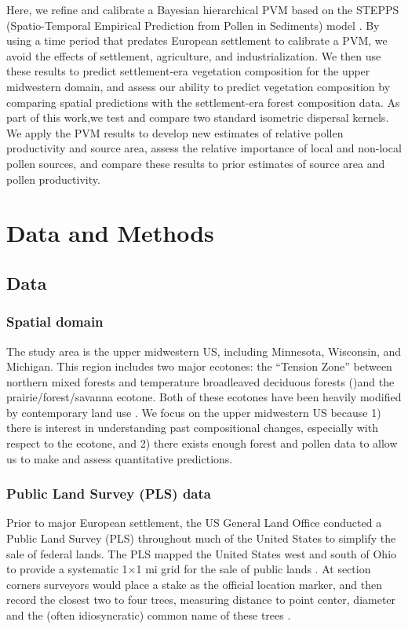\documentclass[12pt]{article}
\begin{document}
Here, we refine and calibrate a Bayesian hierarchical PVM based on the
STEPPS (Spatio-Temporal Empirical Prediction from Pollen in Sediments)
model \citep{paciorek2009mapping}. By using a time period that
predates European settlement to calibrate a PVM, we avoid the effects
of settlement, agriculture, and industrialization. We then use these
results to predict settlement-era vegetation composition for the upper
midwestern domain, and assess our ability to predict vegetation
composition by comparing spatial predictions with the settlement-era
forest composition data. As part of this work,we test and compare two
standard isometric dispersal kernels. We apply the PVM results to
develop new estimates of relative pollen productivity and source area,
assess the relative importance of local and non-local pollen sources,
and compare these results to prior estimates of source area and pollen
productivity.

\section{Data and Methods}

\subsection{Data}

\subsubsection{Spatial domain}

The study area is the upper midwestern US, including Minnesota,
Wisconsin, and Michigan.  This region includes two major ecotones: the
``Tension Zone'' between northern mixed forests and temperature
broadleaved deciduous forests (\citet{curtis1959vegetation})and the
prairie/forest/savanna ecotone.  Both of these ecotones have been
heavily modified by contemporary land use \citep{goring_witness}. We
focus on the upper midwestern US because 1) there is interest in
understanding past compositional changes, especially with respect to
the ecotone, and 2) there exists enough forest and pollen data to
allow us to make and assess quantitative predictions.

\subsubsection{Public Land Survey (PLS) data}
Prior to major European settlement, the US General Land Office
conducted a Public Land Survey (PLS) throughout much of the United
States to simplify the sale of federal lands. The PLS mapped the
United States west and south of Ohio to provide a systematic
1$\times$1 mi grid for the sale of public lands
\citep{stewart1935public, white1983history}. At section corners
surveyors would place a stake as the official location marker, and
then record the closest two to four trees, measuring distance to point
center, diameter and the (often idiosyncratic) common name of these
trees \citep{mladenoff2002narrowing}.  
\end{document}
